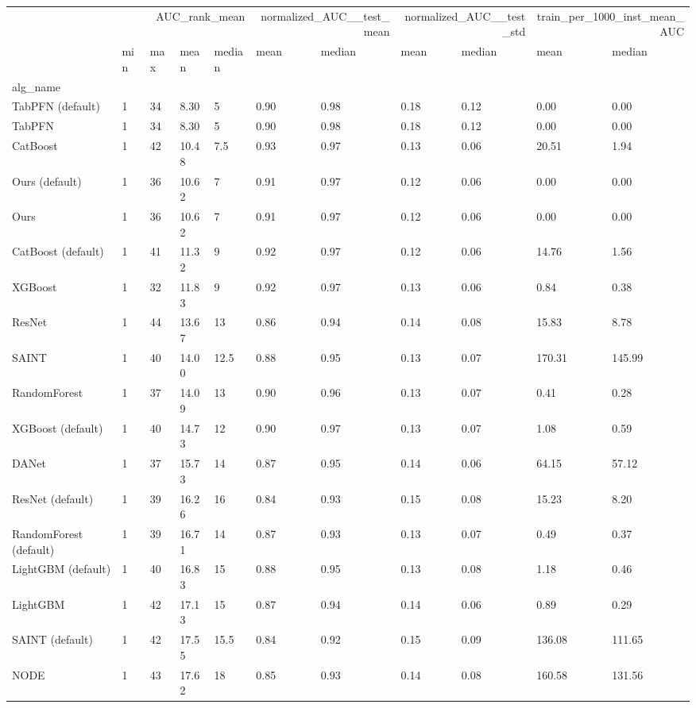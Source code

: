 \begin{tabular}{lllllllllll}
\toprule
 & \multicolumn{4}{r}{AUC_rank_mean} & \multicolumn{2}{r}{normalized_AUC__test_mean} & \multicolumn{2}{r}{normalized_AUC__test_std} & \multicolumn{2}{r}{train_per_1000_inst_mean_AUC} \\
 & min & max & mean & median & mean & median & mean & median & mean & median \\
alg_name &  &  &  &  &  &  &  &  &  &  \\
\midrule
TabPFN (default) & 1 & 34 & 8.30 & 5 & 0.90 & 0.98 & 0.18 & 0.12 & 0.00 & 0.00 \\
TabPFN & 1 & 34 & 8.30 & 5 & 0.90 & 0.98 & 0.18 & 0.12 & 0.00 & 0.00 \\
CatBoost & 1 & 42 & 10.48 & 7.5 & 0.93 & 0.97 & 0.13 & 0.06 & 20.51 & 1.94 \\
Ours (default) & 1 & 36 & 10.62 & 7 & 0.91 & 0.97 & 0.12 & 0.06 & 0.00 & 0.00 \\
Ours & 1 & 36 & 10.62 & 7 & 0.91 & 0.97 & 0.12 & 0.06 & 0.00 & 0.00 \\
CatBoost (default) & 1 & 41 & 11.32 & 9 & 0.92 & 0.97 & 0.12 & 0.06 & 14.76 & 1.56 \\
XGBoost & 1 & 32 & 11.83 & 9 & 0.92 & 0.97 & 0.13 & 0.06 & 0.84 & 0.38 \\
ResNet & 1 & 44 & 13.67 & 13 & 0.86 & 0.94 & 0.14 & 0.08 & 15.83 & 8.78 \\
SAINT & 1 & 40 & 14.00 & 12.5 & 0.88 & 0.95 & 0.13 & 0.07 & 170.31 & 145.99 \\
RandomForest & 1 & 37 & 14.09 & 13 & 0.90 & 0.96 & 0.13 & 0.07 & 0.41 & 0.28 \\
XGBoost (default) & 1 & 40 & 14.73 & 12 & 0.90 & 0.97 & 0.13 & 0.07 & 1.08 & 0.59 \\
DANet & 1 & 37 & 15.73 & 14 & 0.87 & 0.95 & 0.14 & 0.06 & 64.15 & 57.12 \\
ResNet (default) & 1 & 39 & 16.26 & 16 & 0.84 & 0.93 & 0.15 & 0.08 & 15.23 & 8.20 \\
RandomForest (default) & 1 & 39 & 16.71 & 14 & 0.87 & 0.93 & 0.13 & 0.07 & 0.49 & 0.37 \\
LightGBM (default) & 1 & 40 & 16.83 & 15 & 0.88 & 0.95 & 0.13 & 0.08 & 1.18 & 0.46 \\
LightGBM & 1 & 42 & 17.13 & 15 & 0.87 & 0.94 & 0.14 & 0.06 & 0.89 & 0.29 \\
SAINT (default) & 1 & 42 & 17.55 & 15.5 & 0.84 & 0.92 & 0.15 & 0.09 & 136.08 & 111.65 \\
NODE & 1 & 43 & 17.62 & 18 & 0.85 & 0.93 & 0.14 & 0.08 & 160.58 & 131.56 \\

\end{tabular}
